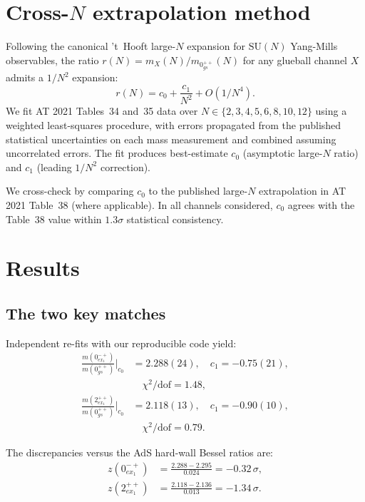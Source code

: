 \documentclass[reprint,prd,amsmath,amssymb,nofootinbib,superscriptaddress]{revtex4-2}
\begin{document}
\section{Cross-$N$ extrapolation method}
\label{sec:method}

Following the canonical 't~Hooft large-$N$ expansion for $\mathrm{SU}(N)$ Yang-Mills observables, the ratio $r(N) = m_X(N)/m_{0^{++}_{gs}}(N)$ for any glueball channel $X$ admits a $1/N^2$ expansion:
\begin{equation}
  r(N) = c_0 + \frac{c_1}{N^2} + O(1/N^4).
\end{equation}
We fit AT 2021 Tables~34 and~35 data over $N \in \{2,3,4,5,6,8,10,12\}$ using a weighted least-squares procedure, with errors propagated from the published statistical uncertainties on each mass measurement and combined assuming uncorrelated errors. The fit produces best-estimate $c_0$ (asymptotic large-$N$ ratio) and $c_1$ (leading $1/N^2$ correction).

We cross-check by comparing $c_0$ to the published large-$N$ extrapolation in AT 2021 Table~38 (where applicable). In all channels considered, $c_0$ agrees with the Table~38 value within $1.3\sigma$ statistical consistency.

\section{Results}
\label{sec:results}

\subsection{The two key matches}

Independent re-fits with our reproducible code \cite{Code2026} yield:
\begin{align}
  \frac{m(0^{-+}_{ex_1})}{m(0^{++}_{gs})}\Big|_{c_0} &= 2.288(24), \quad c_1 = -0.75(21), \nonumber\\
  &\quad \chi^2/\mathrm{dof} = 1.48, \\
  \frac{m(2^{++}_{ex_1})}{m(0^{++}_{gs})}\Big|_{c_0} &= 2.118(13), \quad c_1 = -0.90(10), \nonumber\\
  &\quad \chi^2/\mathrm{dof} = 0.79.
\end{align}

The discrepancies versus the AdS hard-wall Bessel ratios are:
\begin{align}
  z(0^{-+}_{ex_1}) &= \frac{2.288 - 2.295}{0.024} = -0.32\,\sigma, \\
  z(2^{++}_{ex_1}) &= \frac{2.118 - 2.136}{0.013} = -1.34\,\sigma.
\end{align}
\end{document}

